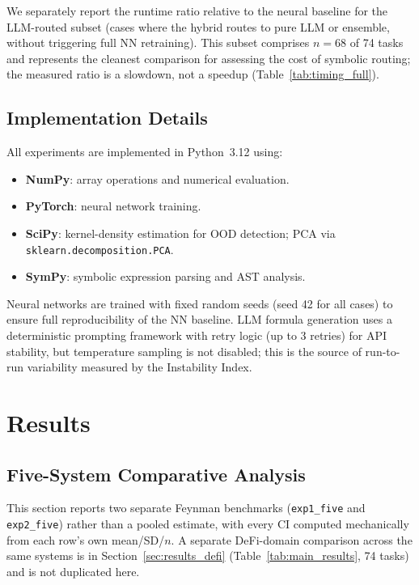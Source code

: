\documentclass[twoside,11pt]{article}
\begin{document}
We separately report the runtime ratio relative to the neural baseline for the
LLM-routed subset (cases where the hybrid routes to pure LLM or ensemble,
without triggering full NN retraining). This subset comprises $n=68$ of 74 tasks
and represents the cleanest comparison for assessing the cost of symbolic
routing; the measured ratio is a slowdown, not a speedup (Table~\ref{tab:timing_full}).

\subsection{Implementation Details}\label{subsec:implementation-details}
\label{sec:setup_impl}

All experiments are implemented in Python~3.12 using:
\begin{itemize}
  \item \textbf{NumPy}: array operations and numerical evaluation.
  \item \textbf{PyTorch}: neural network training.
  \item \textbf{SciPy}: kernel-density estimation for OOD detection; PCA via
    \texttt{sklearn.decomposition.PCA}.
  \item \textbf{SymPy}: symbolic expression parsing and AST analysis.
\end{itemize}

Neural networks are trained with fixed random seeds (seed 42 for all cases) to
ensure full reproducibility of the NN baseline.  LLM formula generation uses a
deterministic prompting framework with retry logic (up to 3 retries) for API
stability, but temperature sampling is not disabled; this is the source of
run-to-run variability measured by the Instability Index.

\section{Results}
\label{sec:results}

\subsection{Five-System Comparative Analysis}\label{subsec:fivesystem-comparative-analysis-feynman-}
\label{sec:five_systems}

This section reports two separate Feynman benchmarks (\texttt{exp1\_five} and
\texttt{exp2\_five}) rather than a pooled estimate, with every CI computed
mechanically from each row's own mean/SD/$n$. A separate DeFi-domain comparison
across the same systems is in Section~\ref{sec:results_defi}
(Table~\ref{tab:main_results}, 74 tasks) and is not duplicated here.
\end{document}
